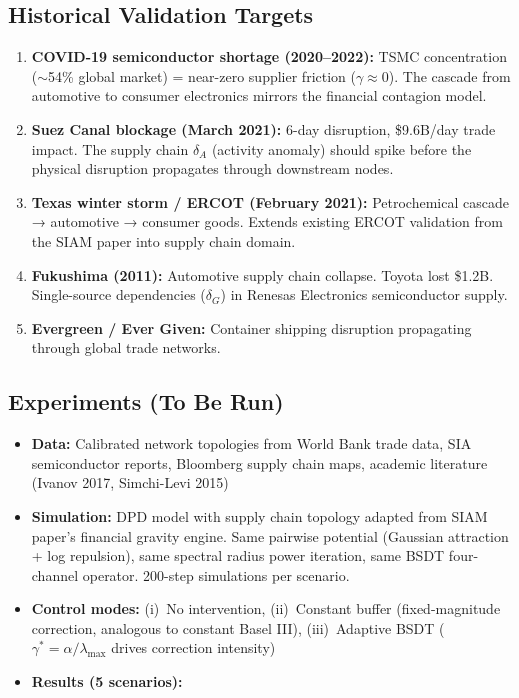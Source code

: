 \documentclass[11pt,a4paper]{article}
\begin{document}
\subsection{Historical Validation Targets}
\begin{enumerate}[nosep]
  \item \textbf{COVID-19 semiconductor shortage (2020--2022):}
        TSMC concentration ($\sim$54\% global market) = near-zero
        supplier friction ($\gamma \approx 0$). The cascade from
        automotive to consumer electronics mirrors the financial
        contagion model.

  \item \textbf{Suez Canal blockage (March 2021):}
        6-day disruption, \$9.6B/day trade impact. The supply chain
        $\delta_A$ (activity anomaly) should spike before the physical
        disruption propagates through downstream nodes.

  \item \textbf{Texas winter storm / ERCOT (February 2021):}
        Petrochemical cascade → automotive → consumer goods.
        Extends existing ERCOT validation from the SIAM paper into
        supply chain domain.

  \item \textbf{Fukushima (2011):}
        Automotive supply chain collapse. Toyota lost \$1.2B.
        Single-source dependencies ($\delta_G$) in Renesas Electronics
        semiconductor supply.

  \item \textbf{Evergreen / Ever Given:}
        Container shipping disruption propagating through global trade
        networks.
\end{enumerate}

\subsection{Experiments (To Be Run)}
\begin{itemize}[nosep]
  \item \textbf{Data:} Calibrated network topologies from World Bank trade data,
        SIA semiconductor reports, Bloomberg supply chain maps, academic literature
        (Ivanov 2017, Simchi-Levi 2015)
  \item \textbf{Simulation:} DPD model with supply chain topology adapted from
        SIAM paper's financial gravity engine.  Same pairwise potential
        (Gaussian attraction + log repulsion), same spectral radius power iteration,
        same BSDT four-channel operator.  200-step simulations per scenario.
  \item \textbf{Control modes:} (i)~No intervention, (ii)~Constant buffer
        (fixed-magnitude correction, analogous to constant Basel III), (iii)~Adaptive
        BSDT ($\gamma^* = \alpha / \lambda_{\max}$ drives correction intensity)
  \item \textbf{Results (5 scenarios):}
\end{itemize}
\end{document}
